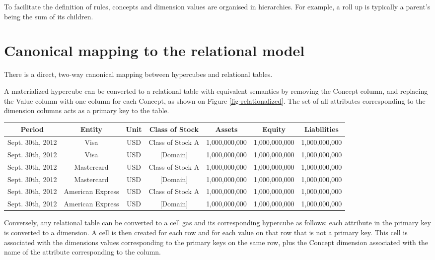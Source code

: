 \documentclass{vldb}
\begin{document}
To facilitate the definition of rules, concepts and dimension values are organised in hierarchies. For example, a roll up is typically a parent's being the sum of its children.

\section{Canonical mapping to the relational model}

There is a direct, two-way canonical mapping between hypercubes and relational tables.

A materialized hypercube can be converted to a relational table with equivalent semantics by removing the Concept column, and replacing the Value column with one column for each Concept, as shown on Figure \ref{fig-relationalized}. The set of all attributes corresponding to the dimension columns acts as a primary key to the table.

\begin{figure*}
\caption{A relational table corresponding to a hypercube}
\label{fig-relationalized}
\begin{tabular}{|c|c|c|c||c|c|c|}
\hline
Period & Entity & Unit & Class of Stock & Assets & Equity & Liabilities \\
\hline
Sept. 30th, 2012 & Visa & USD & Class of Stock A & 1,000,000,000 & 1,000,000,000 & 1,000,000,000 \\
Sept. 30th, 2012 & Visa & USD & [Domain] & 1,000,000,000 & 1,000,000,000 & 1,000,000,000 \\

Sept. 30th, 2012 & Mastercard & USD & Class of Stock A & 1,000,000,000 & 1,000,000,000 & 1,000,000,000 \\

Sept. 30th, 2012 & Mastercard & USD & [Domain] & 1,000,000,000 & 1,000,000,000 & 1,000,000,000 \\

Sept. 30th, 2012 & American Express & USD & Class of Stock A & 1,000,000,000 & 1,000,000,000 & 1,000,000,000 \\

Sept. 30th, 2012 & American Express & USD & [Domain] & 1,000,000,000 & 1,000,000,000 & 1,000,000,000 \\

\hline
\end{tabular}
\end{figure*}

Conversely, any relational table can be converted to a cell gas and its corresponding hypercube as follows: each attribute in the primary key is converted to a dimension. A cell is
then created for each row and for each value on that row that is not a primary key. This cell is associated with the dimensions values corresponding to the primary keys on the same row, plus the Concept dimension associated with the name of the attribute corresponding to the column.
\end{document}
